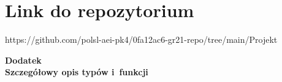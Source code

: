 \documentclass[12pt,a4paper]{article}
\begin{document}
\section{Link do repozytorium}
https://github.com/polsl-aei-pk4/0fa12ac6-gr21-repo/tree/main/Projekt
 
\cleardoublepage

\rule{0cm}{0cm}

\vfill

\begin{center}
\Huge\bfseries Dodatek\\Szczegółowy opis typów i~funkcji\par
\end{center}

\vfill 

\rule{0cm}{0cm}
\end{document}
